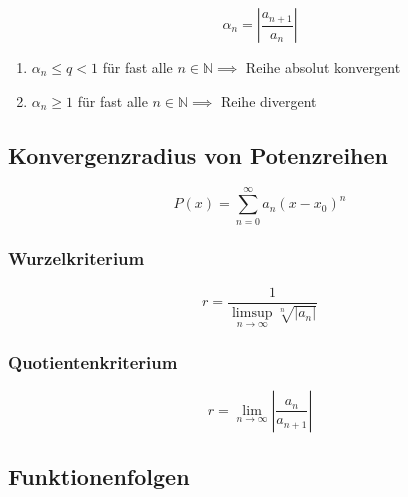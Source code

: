 \documentclass[twoside]{article}
\begin{document}
				\begin{displaymath}
					\alpha_n = |\frac{a_{n+1}}{a_{n}}|
				\end{displaymath}
				
				\begin{enumerate}[]
					\item \begin{math} \alpha_n \leq q < 1 \end{math} für fast alle \begin{math} n \in \mathbb{N} \implies \end{math} Reihe absolut konvergent
					\item \begin{math} \alpha_n \geq 1\end{math} für fast alle \begin{math} n \in \mathbb{N} \implies \end{math} Reihe divergent
				\end{enumerate}
	
		\subsection{Konvergenzradius von Potenzreihen}
		
			\begin{displaymath}
				P(x) = \sum_{n=0}^{\infty} a_{n}(x-x_0)^n
			\end{displaymath}
			
			\subsubsection{Wurzelkriterium}
			
				\begin{displaymath}
					r = \frac{1}{\limsup\limits_{n \to \infty} \sqrt[n]{|a_{n}|}}
				\end{displaymath}
				
			\subsubsection{Quotientenkriterium}
			
				\begin{displaymath}
					r = \lim\limits_{n \to \infty} |\frac{a_{n}}{a_{n+1}}|
				\end{displaymath}
		
		\subsection{Funktionenfolgen}
\end{document}
